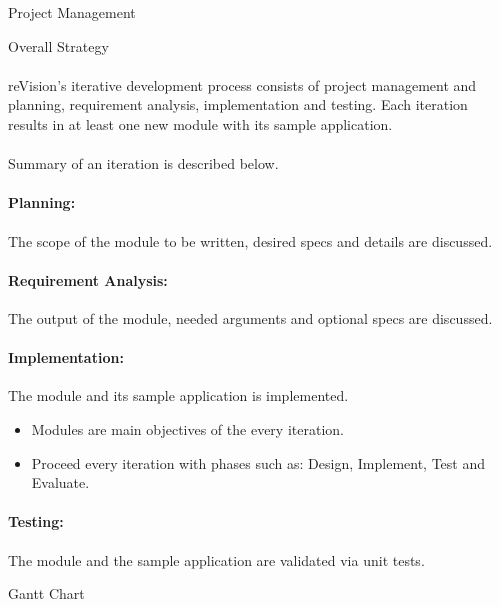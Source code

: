 \documentclass[12pt, a4paper]{article} \pagenumbering{gobble}
\begin{document}
\begin{section}{Project Management}
  \begin{subsection}{Overall Strategy}
    \paragraph{}{reVision's iterative development process consists of project management and planning, requirement analysis, implementation and testing. Each iteration results in at least one new module with its sample application.}\\ \\
    Summary of an iteration is described below.
    \paragraph{Planning:}{The scope of the module to be written, desired specs and details are discussed.}
    \paragraph{Requirement Analysis:}{The output of the module, needed arguments and optional specs are discussed.}
    \paragraph{Implementation:}{The module and its sample application is implemented.
    \begin{itemize}
      \item Modules are main objectives of the every iteration.
      \item Proceed every iteration with phases such as: Design, Implement, Test and Evaluate.
    \end{itemize}}
    \paragraph{Testing:}{The module and the sample application are validated via unit tests.}
  \end{subsection}

  \newpage

  \begin{subsection}{Gantt Chart}
  \vspace*{\fill}
  \begin{centering}
\end{centering}
\end{subsection}
\end{section}
\end{document}
